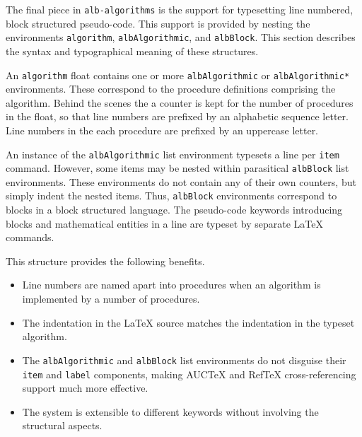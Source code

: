 \documentclass[11pt,a4paper,oneside,titlepage]{alb-latex}
\begin{document}
The final piece in \texttt{alb-algorithms} is the support for
typesetting line numbered, block structured pseudo-code.  This support
is provided by nesting the environments \texttt{algorithm},
\texttt{albAlgorithmic}, and \texttt{albBlock}.  This section describes
the syntax and typographical meaning of these structures.

An \texttt{algorithm} float contains one or more \texttt{albAlgorithmic}
or \texttt{albAlgorithmic*} environments.  These correspond to the
procedure definitions comprising the algorithm.  Behind the scenes the a
counter is kept for the number of procedures in the float, so that line
numbers are prefixed by an alphabetic sequence letter.  Line numbers in
the each procedure are prefixed by an uppercase letter.

An instance of the \texttt{albAlgorithmic} list environment typesets a
line per \texttt{item} command.  However, some items may be nested
within parasitical \texttt{albBlock} list environments.  These
environments do not contain any of their own counters, but simply indent
the nested items.  Thus, \texttt{albBlock} environments correspond to
blocks in a block structured language.  The pseudo-code keywords
introducing blocks and mathematical entities in a line are typeset by
separate \LaTeX{} commands.

This structure provides the following benefits.
\begin{itemize}
\item Line numbers are named apart into procedures when an algorithm is
  implemented by a number of procedures.
\item The indentation in the \LaTeX{} source matches the indentation in
  the typeset algorithm.
\item The \texttt{albAlgorithmic} and \texttt{albBlock} list environments
  do not disguise their \texttt{item} and \texttt{label} components,
  making AUCTeX and RefTeX cross-referencing support much more
  effective.
\item The system is extensible to different keywords without involving
  the structural aspects.
\end{itemize}
\end{document}
